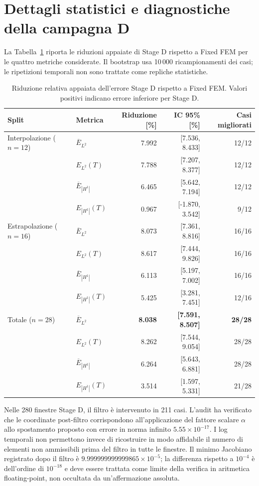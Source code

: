 \section{Dettagli statistici e diagnostiche della campagna D}
\label{app:stage_d_audit}

La Tabella~\ref{tab:paired_stage_d} riporta le riduzioni appaiate di Stage D rispetto a Fixed FEM per le quattro metriche considerate. Il bootstrap usa 10\,000 ricampionamenti dei casi; le ripetizioni temporali non sono trattate come repliche statistiche.

\begin{table}[!t]
\centering\small
\caption{Riduzione relativa appaiata dell'errore Stage D rispetto a Fixed FEM. Valori positivi indicano errore inferiore per Stage D.}
\label{tab:paired_stage_d}
\begin{tabular*}{\textwidth}{@{\extracolsep{\fill}}llrrr}
\toprule
Split & Metrica & Riduzione [\%] & IC 95\% [\%] & Casi migliorati\\
\midrule
Interpolazione ($n=12$) & $\overline E_{L^2}$ & 7.992 & [7.536, 8.433] & 12/12\\
 & $E_{L^2}(T)$ & 7.788 & [7.207, 8.377] & 12/12\\
 & $\overline E_{|H^1|}$ & 6.465 & [5.642, 7.194] & 12/12\\
 & $E_{|H^1|}(T)$ & 0.967 & [-1.870, 3.542] & 9/12\\
\midrule
Estrapolazione ($n=16$) & $\overline E_{L^2}$ & 8.073 & [7.361, 8.816] & 16/16\\
 & $E_{L^2}(T)$ & 8.617 & [7.444, 9.826] & 16/16\\
 & $\overline E_{|H^1|}$ & 6.113 & [5.197, 7.002] & 16/16\\
 & $E_{|H^1|}(T)$ & 5.425 & [3.281, 7.451] & 12/16\\
\midrule
Totale ($n=28$) & $\overline E_{L^2}$ & \textbf{8.038} & \textbf{[7.591, 8.507]} & \textbf{28/28}\\
 & $E_{L^2}(T)$ & 8.262 & [7.544, 9.054] & 28/28\\
 & $\overline E_{|H^1|}$ & 6.264 & [5.643, 6.881] & 28/28\\
 & $E_{|H^1|}(T)$ & 3.514 & [1.597, 5.331] & 21/28\\
\bottomrule
\end{tabular*}
\end{table}

Nelle 280 finestre Stage D, il filtro è intervenuto in 211 casi. L'audit ha verificato che le coordinate post-filtro corrispondono all'applicazione del fattore scalare $\alpha$ allo spostamento proposto con errore in norma infinito $5.55\times10^{-17}$. I log temporali non permettono invece di ricostruire in modo affidabile il numero di elementi non ammissibili prima del filtro in tutte le finestre. Il minimo Jacobiano registrato dopo il filtro è $9.999999999999865\times10^{-5}$; la differenza rispetto a $10^{-4}$ è dell'ordine di $10^{-18}$ e deve essere trattata come limite della verifica in aritmetica floating-point, non occultata da un'affermazione assoluta.
